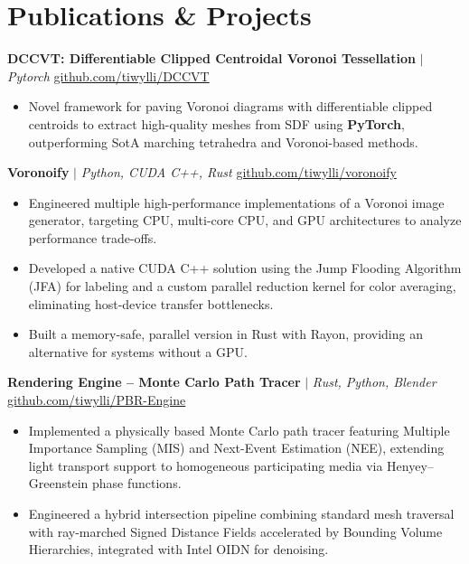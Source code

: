 \documentclass[11pt]{article}       %
\begin{document}
\section*{Publications \& Projects}
\textbf{DCCVT: Differentiable Clipped Centroidal Voronoi Tessellation} $|$ \emph{Pytorch} \hfill \href{https://github.com/tiwylli/DCCVT}{github.com/tiwylli/DCCVT} \\
\vspace{-9pt}
\begin{itemize}
      \item Novel framework for paving Voronoi diagrams with differentiable clipped
            centroids to extract high-quality meshes from SDF using \textbf{PyTorch},
            outperforming SotA marching tetrahedra and Voronoi-based methods.
\end{itemize}

\textbf{Voronoify} $|$ \emph{Python, CUDA C++, Rust} \hfill \href{https://github.com/tiwylli/voronoify}{github.com/tiwylli/voronoify} \\
\vspace{-9pt}
\begin{itemize}
      \item Engineered multiple high-performance implementations of a Voronoi image
            generator, targeting CPU, multi-core CPU, and GPU architectures to analyze
            performance trade-offs.
      \item Developed a native CUDA C++ solution using the Jump Flooding Algorithm (JFA)
            for labeling and a custom parallel reduction kernel for color averaging,
            eliminating host-device transfer bottlenecks. \ifdefined\cvEngineering
      \item Built a memory-safe, parallel version in Rust with Rayon, providing an
            alternative for systems without a GPU. \fi
\end{itemize}

\textbf{Rendering Engine – Monte Carlo Path Tracer} $|$ \emph{Rust, Python, Blender} \hfill \href{https://github.com/tiwylli/PBR-Engine}{github.com/tiwylli/PBR-Engine} \\
\vspace{-9pt}
\begin{itemize}
      \item Implemented a physically based Monte Carlo path tracer featuring Multiple
            Importance Sampling (MIS) and Next-Event Estimation (NEE), extending light
            transport support to homogeneous participating media via Henyey–Greenstein
            phase functions.
      \item Engineered a hybrid intersection pipeline combining standard mesh traversal
            with ray-marched Signed Distance Fields accelerated by Bounding Volume
            Hierarchies, integrated with Intel OIDN for denoising.
\end{itemize}
\end{document}
